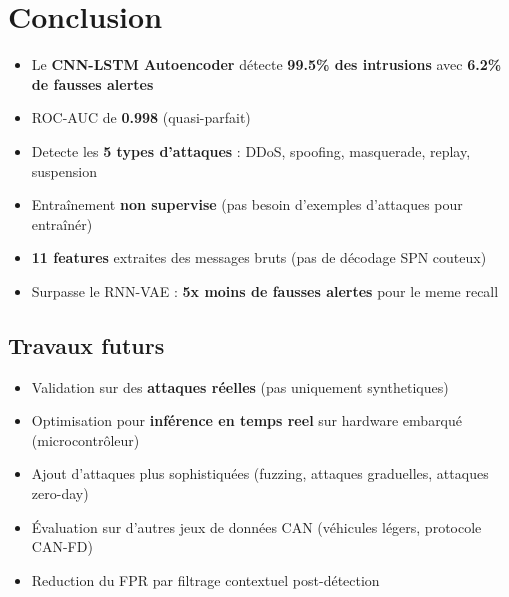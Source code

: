 \documentclass[12pt,a4paper]{article}
\begin{document}
\section{Conclusion}

\begin{tcolorbox}[colback=navy!5, colframe=navy, title=\textbf{Résultats cles}]
\begin{itemize}[noitemsep]
    \item Le \textbf{CNN-LSTM Autoencoder} détecte \textbf{99.5\% des intrusions} avec \textbf{6.2\% de fausses alertes}
    \item ROC-AUC de \textbf{0.998} (quasi-parfait)
    \item Detecte les \textbf{5 types d'attaques} : DDoS, spoofing, masquerade, replay, suspension
    \item Entraînement \textbf{non supervise} (pas besoin d'exemples d'attaques pour entraînér)
    \item \textbf{11 features} extraites des messages bruts (pas de décodage SPN couteux)
    \item Surpasse le RNN-VAE : \textbf{5x moins de fausses alertes} pour le meme recall
\end{itemize}
\end{tcolorbox}

\subsection{Travaux futurs}

\begin{itemize}[noitemsep]
    \item Validation sur des \textbf{attaques réelles} (pas uniquement synthetiques)
    \item Optimisation pour \textbf{inférence en temps reel} sur hardware embarqué (microcontrôleur)
    \item Ajout d'attaques plus sophistiquées (fuzzing, attaques graduelles, attaques zero-day)
    \item Évaluation sur d'autres jeux de données CAN (véhicules légers, protocole CAN-FD)
    \item Reduction du FPR par filtrage contextuel post-détection
\end{itemize}

\end{document}
